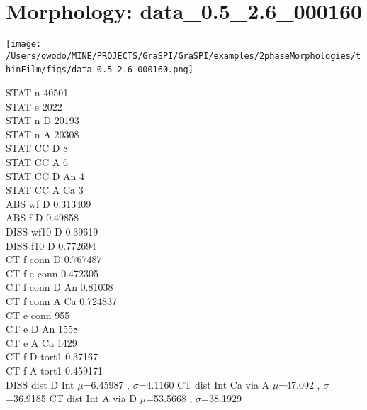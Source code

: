 \documentclass{article}
\begin{document}
\section{Morphology: data\_0.5\_2.6\_000160 }
\parbox{0.35\textwidth}{
\texttt{[image: /Users/owodo/MINE/PROJECTS/GraSPI/GraSPI/examples/2phaseMorphologies/thinFilm/figs/data\_0.5\_2.6\_000160.png]} \  
 ~\newline ~\newline 
\begin{small}
STAT n 40501\\
STAT e 2022\\
STAT n D 20193\\
STAT n A 20308\\
STAT CC D 8\\
STAT CC A 6\\
STAT CC D An 4\\
STAT CC A Ca 3\\
ABS wf D 0.313409\\
ABS f D 0.49858\\
DISS wf10 D 0.39619\\
DISS f10 D 0.772694\\
CT f conn D 0.767487\\
CT f e conn 0.472305\\
CT f conn D An 0.81038\\
CT f conn A Ca 0.724837\\
CT e conn 955\\
CT e D An 1558\\
CT e A Ca 1429\\
CT f D tort1 0.37167\\
CT f A tort1 0.459171\\

DISS dist D Int $\mu$=6.45987 , $\sigma$=4.1160 \newline
CT dist Int Ca via A $\mu$=47.092 , $\sigma$=36.9185 \newline
CT dist Int A via D $\mu$=53.5668 , $\sigma$=38.1929 \newline
\end{small}
}
\end{document}

